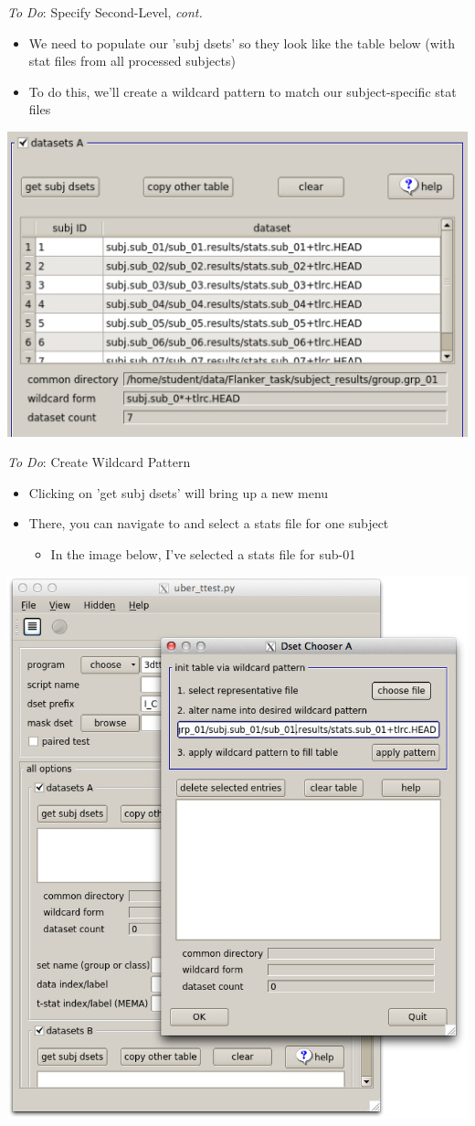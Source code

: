 \documentclass[t,12pt]{beamer}
\begin{document}
\begin{frame}{\emph{To Do}: Specify Second-Level, \textit{cont.}}
\vspace{10pt}
\begin{itemize}
\setlength\itemsep{1em}
\item We need to populate our 'subj dsets' so they look like the table below (with stat files from all processed subjects) 
\item To do this, we'll create a wildcard pattern to match our subject-specific stat files
\end{itemize}
\vspace{4pt}
\centering
\includegraphics[width=.55\textwidth]{images/subj_dsets.png}
\end{frame}

\begin{frame}{\emph{To Do}: Create Wildcard Pattern}
\vspace{10pt}
\begin{itemize}
\setlength\itemsep{1em}
\item Clicking on 'get subj dsets' will bring up a new menu
\item There, you can navigate to and select a stats file for one subject
\vspace{4pt}
\begin{itemize}
\item In the image below, I've selected a stats file for sub-01
\end{itemize}
\end{itemize}
\vspace{4pt}
\centering
\includegraphics[width=.45\textwidth]{images/choose_rep_file.png}
\end{frame}
\end{document}
